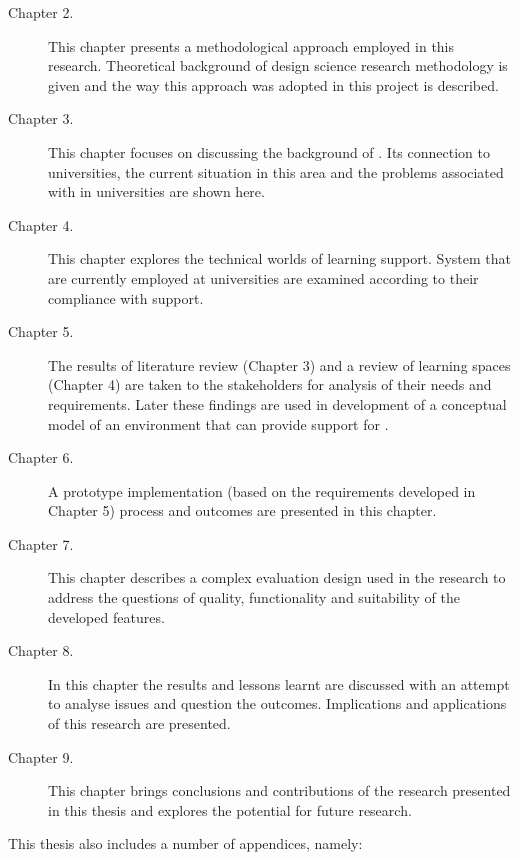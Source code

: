 \begin{description}
\item[Chapter 2.] This chapter presents a methodological approach employed in
this research. Theoretical background of design science research methodology is
given and the way this approach was adopted in this project is described.
\item[Chapter 3.] This chapter focuses on discussing the background of
\LLLsn. Its connection to universities, the current situation in this area and
the problems associated with \LLLs in universities are shown here.
\item[Chapter 4.] This chapter explores the technical worlds of learning
support. System that are currently employed at universities are examined according
to their compliance with \LLLs support.
\item[Chapter 5.] The results of literature review (Chapter 3) and a review of
learning spaces (Chapter 4) are taken to the stakeholders for analysis of their
needs and requirements. Later these findings are used in development of a
conceptual model of an environment that can provide support for \LLLsn.
\item[Chapter 6.] A prototype implementation (based on the requirements
developed in Chapter 5) process and outcomes are presented in this chapter.
\item[Chapter 7.] This chapter describes a complex evaluation design used in the
research to address the questions of quality, functionality and suitability of
the developed features.
\item[Chapter 8.] In this chapter the results and lessons learnt are discussed
with an attempt to analyse issues and question the outcomes. Implications and
applications of this research are presented.
\item[Chapter 9.] This chapter brings conclusions and contributions of the
research presented in this thesis and explores the potential for future research.
\end{description}

This thesis also includes a number of appendices, namely:

